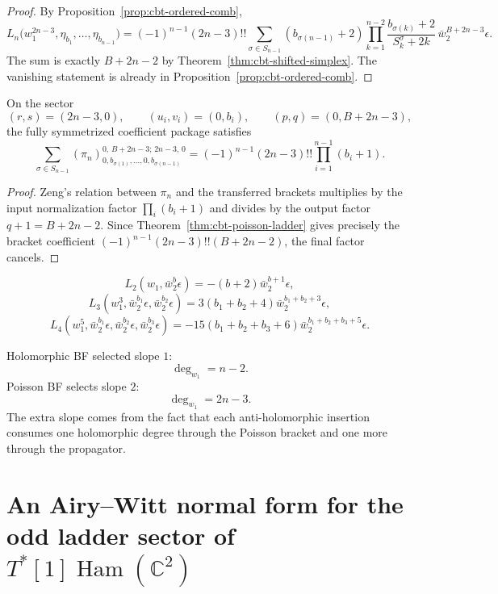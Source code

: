 \begin{proof}
By Proposition~\ref{prop:cbt-ordered-comb},
\[
L_n\bigl(w_1^{2n-3},\eta_{b_1},\dots,\eta_{b_{n-1}}\bigr)
=
(-1)^{n-1}(2n-3)!!
\sum_{\sigma\in S_{n-1}}
(b_{\sigma(n-1)}+2)\prod_{k=1}^{n-2}
\frac{b_{\sigma(k)}+2}{S_k^\sigma+2k}\,
\bar w_2^{B+2n-3}\epsilon.
\]
The sum is exactly $B+2n-2$ by Theorem~\ref{thm:cbt-shifted-simplex}. The vanishing statement is already in Proposition~\ref{prop:cbt-ordered-comb}.
\end{proof}

\begin{corollary}
On the sector
\[
(r,s)=(2n-3,0),
\qquad
(u_i,v_i)=(0,b_i),
\qquad
(p,q)=(0,B+2n-3),
\]
the fully symmetrized coefficient package satisfies
\[
\sum_{\sigma\in S_{n-1}}
(\pi_n)^{0,\,B+2n-3;\,2n-3,\,0}_{0,b_{\sigma(1)},\dots,0,b_{\sigma(n-1)}}
=
(-1)^{n-1}(2n-3)!!\prod_{i=1}^{n-1}(b_i+1).
\]
\end{corollary}

\begin{proof}
Zeng's relation between $\pi_n$ and the transferred brackets multiplies by the input normalization factor $\prod_i (b_i+1)$ and divides by the output factor $q+1=B+2n-2$. Since Theorem~\ref{thm:cbt-poisson-ladder} gives precisely the bracket coefficient $(-1)^{n-1}(2n-3)!!(B+2n-2)$, the final factor cancels.
\end{proof}

\begin{corollary}[examples]
\[
L_2(w_1,\bar w_2^b\epsilon)=-(b+2)\bar w_2^{b+1}\epsilon,
\]
\[
L_3(w_1^3,\bar w_2^{b_1}\epsilon,\bar w_2^{b_2}\epsilon)=
3(b_1+b_2+4)\bar w_2^{b_1+b_2+3}\epsilon,
\]
\[
L_4(w_1^5,\bar w_2^{b_1}\epsilon,\bar w_2^{b_2}\epsilon,\bar w_2^{b_3}\epsilon)=
-15(b_1+b_2+b_3+6)\bar w_2^{b_1+b_2+b_3+5}\epsilon.
\]
\end{corollary}

\begin{remark}
Holomorphic BF selected slope $1$:
\[
\deg_{w_1}=n-2.
\]
Poisson BF selects slope $2$:
\[
\deg_{w_1}=2n-3.
\]
The extra slope comes from the fact that each anti-holomorphic insertion consumes one holomorphic degree through the Poisson bracket and one more through the propagator.
\end{remark}

\section{An Airy--Witt normal form for the odd ladder sector of \texorpdfstring{$T^*[1]\operatorname{Ham}(\mathbb{C}^2)$}{T*[1]Ham(C2)}}

